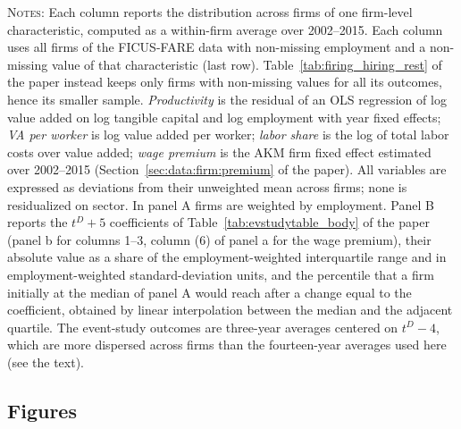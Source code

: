 \documentclass[11pt]{article}
\begin{document}
\begin{table}[h!]
\centering
\caption{Dispersion of firm-level characteristics across firms, 2002--2015 averages (Appendix Table~\ref{apptab:dispersion} of the paper)}
\label{tab:R3_dispersion}
{\footnotesize
}

\par\medskip
\begin{minipage}{0.95\linewidth}\footnotesize\justifying\textsc{Notes}: Each column reports the distribution across firms of one firm-level characteristic, computed as a within-firm average over 2002--2015. Each column uses all firms of the FICUS-FARE data with non-missing employment and a non-missing value of that characteristic (last row). Table~\ref{tab:firing_hiring_rest} of the paper instead keeps only firms with non-missing values for all its outcomes, hence its smaller sample. \textit{Productivity} is the residual of an OLS regression of log value added on log tangible capital and log employment with year fixed effects; \textit{VA per worker} is log value added per worker; \textit{labor share} is the log of total labor costs over value added; \textit{wage premium} is the AKM firm fixed effect estimated over 2002--2015 (Section~\ref{sec:data:firm:premium} of the paper). All variables are expressed as deviations from their unweighted mean across firms; none is residualized on sector. In panel A firms are weighted by employment. Panel B reports the $t^D+5$ coefficients of Table~\ref{tab:evstudytable_body} of the paper (panel b for columns 1--3, column (6) of panel a for the wage premium), their absolute value as a share of the employment-weighted interquartile range and in employment-weighted standard-deviation units, and the percentile that a firm initially at the median of panel A would reach after a change equal to the coefficient, obtained by linear interpolation between the median and the adjacent quartile. The event-study outcomes are three-year averages centered on $t^D-4$, which are more dispersed across firms than the fourteen-year averages used here (see the text).\end{minipage}
\end{table}

\clearpage
\subsection*{Figures}
\end{document}
